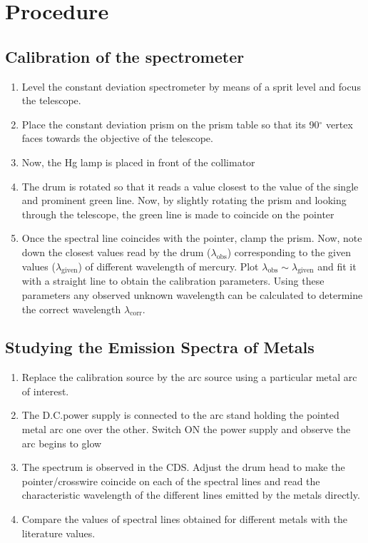 \section{Procedure}

\subsection*{Calibration of the spectrometer}

\begin{enumerate}
    \item Level the constant deviation spectrometer by means of a sprit level and focus the
    telescope.
    \item Place the constant deviation prism on the prism table so that its 90$^{\circ}$ vertex faces
    towards the objective of the telescope.
    \item Now, the Hg lamp is placed in front of the collimator
    \item The drum is rotated so that it reads a value closest to the value of the single and
    prominent green line. Now, by slightly rotating the prism and looking through the
    telescope, the green line is made to coincide on the pointer
    \item Once the spectral line coincides with the pointer, clamp the prism. Now, note down
    the closest values read by the drum ($\lambda_\text{obs}$) corresponding to the given values
    ($\lambda_\text{given}$) of different wavelength of mercury. Plot $\lambda_\text{obs} \sim \lambda_\text{given}$ and fit it with a
    straight line to obtain the calibration parameters. Using these parameters any observed
    unknown wavelength can be calculated to determine the correct wavelength $\lambda_\text{corr}$.
\end{enumerate}

\subsection*{Studying the Emission Spectra of Metals}

\begin{enumerate}
    \item Replace the calibration source by the arc source using a particular metal arc of
    interest.
    \item The D.C.power supply is connected to the arc stand holding the pointed metal arc one
    over the other. Switch ON the power supply and observe the arc begins to glow
    \item The spectrum is observed in the CDS. Adjust the drum head to make the
    pointer/crosswire coincide on each of the spectral lines and read the characteristic
    wavelength of the different lines emitted by the metals directly.
    \item Compare the values of spectral lines obtained for different metals with the literature
    values.
\end{enumerate}

